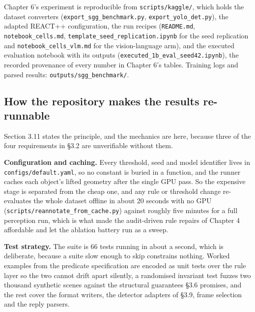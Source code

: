 Chapter 6's experiment is reproducible from \texttt{scripts/kaggle/}, which holds the dataset converters (\texttt{export\_\allowbreak{}sgg\_\allowbreak{}benchmark.py}, \texttt{export\_\allowbreak{}yolo\_\allowbreak{}det.py}), the adapted REACT++ configuration, the run recipes (\texttt{README.md}, \texttt{notebook\_\allowbreak{}cells.md}, \texttt{template\_\allowbreak{}seed\_\allowbreak{}replication.ipynb} for the seed replication and \texttt{notebook\_\allowbreak{}cells\_\allowbreak{}vlm.md} for the vision-language arm), and the executed evaluation notebook with its outputs (\texttt{executed\_\allowbreak{}1b\_\allowbreak{}eval\_\allowbreak{}seed42.ipynb}), the recorded provenance of every number in Chapter 6's tables. Training logs and parsed results: \texttt{outputs/sgg\_\allowbreak{}benchmark/}.

\subsection{How the repository makes the results re-runnable}

Section 3.11 states the principle, and the mechanics are here, because three of the four requirements in \S{}3.2 are unverifiable without them.

\textbf{Configuration and caching.} Every threshold, seed and model identifier lives in \texttt{configs/default.yaml}, so no constant is buried in a function, and the runner caches each object's lifted geometry after the single GPU pass. So the expensive stage is separated from the cheap one, and any rule or threshold change re-evaluates the whole dataset offline in about 20 seconds with no GPU (\texttt{scripts/reannotate\_\allowbreak{}from\_\allowbreak{}cache.py}) against roughly five minutes for a full perception run, which is what made the audit-driven rule repairs of Chapter 4 affordable and let the ablation battery run as a sweep.

\textbf{Test strategy.} The suite is 66 tests running in about a second, which is deliberate, because a suite slow enough to skip constrains nothing. Worked examples from the predicate specification are encoded as unit tests over the rule layer so the two cannot drift apart silently, a randomised invariant test fuzzes two thousand synthetic scenes against the structural guarantees \S{}3.6 promises, and the rest cover the format writers, the detector adapters of \S{}3.9, frame selection and the reply parsers.

